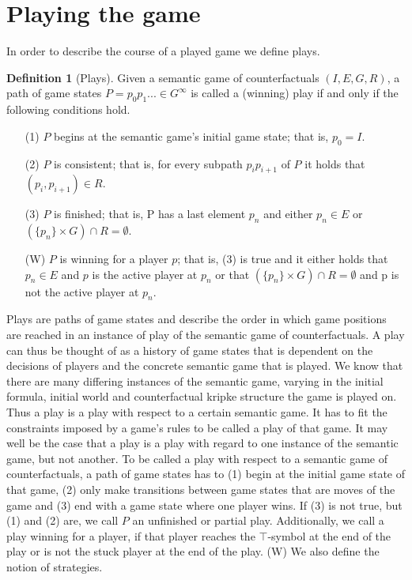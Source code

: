 \documentclass[a4paper,american]{paper}
\theoremstyle{definition}\newtheorem{definition}{Definition}
\begin{document}
\section{Playing the game}
In order to describe the course of a played game we define plays.
\begin{definition}[Plays]
Given a semantic game of counterfactuals $(I, E, G, R)$, a path of game states $P=p_0p_1...\in G^{\infty}$ is called a (winning) play if and only if the following conditions hold.
\begin{itemize}
	\item[(1)] $P$ begins at the semantic game's initial game state; that is, $p_0=I$.
	\item[(2)] $P$ is consistent; that is, for every subpath $p_ip_{i+1}$ of $P$ it holds that $(p_{i},p_{i+1})\in R$.
	\item[(3)] $P$ is finished; that is, P has a last element $p_n$ and either $p_n\in E$ or $(\{p_n\}\times G)\cap R = \emptyset$.
	\item[(W)] $P$ is winning for a player $p$; that is, (3) is true and it either holds that $p_n\in E$ and $p$ is the active player at $p_n$ or that $(\{p_n\}\times G)\cap R = \emptyset$ and p is not the active player at $p_n$.
\end{itemize}
\end{definition}
Plays are paths of game states and describe the order in which game positions are reached in an instance of play of the semantic game of counterfactuals. A play can thus be thought of as a history of game states that is dependent on the decisions of players and the concrete semantic game that is played. We know that there are many differing instances of the semantic game, varying in the initial formula, initial world and counterfactual kripke structure the game is played on. Thus a play is a play with respect to a certain semantic game. It has to fit the constraints imposed by a game's rules to be called a play of that game. It may well be the case that a play is a play with regard to one instance of the semantic game, but not another. To be called a play with respect to a semantic game of counterfactuals, a path of game states has to (1) begin at the initial game state of that game, (2) only make transitions between game states that are moves of the game and (3) end with a game state where one player wins. If (3) is not true, but (1) and (2) are, we call $P$ an unfinished or partial play. Additionally, we call a play winning for a player, if that player reaches the $\top$-symbol at the end of the play or is not the stuck player at the end of the play. (W) We also define the notion of strategies.
\end{document}
